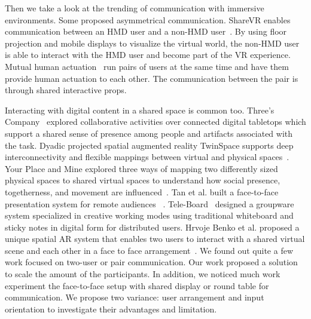 \documentclass{sigchi}
\begin{document}
Then we take a look at the trending of communication with immersive environments.
Some proposed asymmetrical communication. ShareVR enables communication between an HMD user and a non-HMD user~\cite{gugenheimer2017sharevr}. By using floor projection and mobile displays to visualize the virtual world, the non-HMD user is able to interact with the HMD user and become part of the VR experience. Mutual human actuation~\cite{cheng2017mutual} run pairs of users at the same time and have them provide human actuation to each other. The communication between the pair is through shared interactive props.

Interacting with digital content in a shared space is common too. Three's Company~\cite{tang2010three} explored collaborative activities over connected digital tabletops which support a shared sense of presence among people and artifacts associated with the task. 
Dyadic projected spatial augmented reality 
TwinSpace supports deep interconnectivity and flexible mappings between virtual and physical spaces~\cite{reilly2010twinspace}.
Your Place and Mine explored three ways of mapping two differently sized
physical spaces to shared virtual spaces to understand how social presence, togetherness, and movement are influenced~\cite{sra2018}.
Tan et al. built a face-to-face presentation system for remote audiences ~\cite{gazeAwareness}.
Tele-Board~\cite{gumienny2011tele} designed a groupware system specialized in creative working modes using traditional whiteboard and sticky notes in digital form for distributed users.
Hrvoje Benko et al. proposed a unique spatial AR system that enables two users to interact with a shared virtual scene and each other in a
face to face arrangement~\cite{benko2014dyadic}. 
We found out quite a few work focused on two-user or pair communication. Our work proposed a solution to scale the amount of the participants. In addition, we noticed much work experiment the face-to-face setup with shared display or round table for communication. We propose two variance: user arrangement and input orientation to investigate their advantages and limitation.
\end{document}

